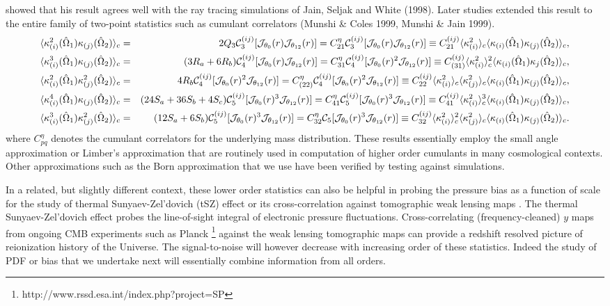 \documentclass[usenatbib]{mn2e}
\def\la{\langle}
\def\ra{\rangle}
\def\oh{\hat\Omega}
\def\oh{{\hat\Omega}}
\def\ikap0{{\cal J}_{\theta_0}(r)}
\def\ikapp{{\cal J}_{\theta_{12}}(r)}
\begin{document}
showed that his result agrees well with the ray tracing
simulations of Jain, Seljak and White (1998). Later studies 
extended this result to the entire family of two-point statistics such as cumulant correlators 
(Munshi \& Coles 1999, Munshi \& Jain 1999). 
\begin{eqnarray}
\langle \kappa_{(i)}^2(\oh_1) \kappa_{(j)}(\oh_2) \rangle_c & = &
2Q_3 {\cal C}_3^{(ij)} [\ikap0 \ikapp] =
C_{21}^{\eta}{\cal C}_3^{(ij)} [\ikap0 \ikapp] \equiv C_{21}^{(ij)} \langle
\kappa_{(i)}^2 \rangle_c \langle \kappa_{(i)}(\oh_1) \kappa_{(j)}(\oh_2) \rangle_c, \\
\langle \kappa_{(i)}^3(\oh_1) \kappa_{(j)}( \oh_2) \rangle_c & = &
(3R_a + 6 R_b){\cal C}_4^{(ij)} [\ikap0 \ikapp] =
 C_{31}^{\eta}{\cal C}_4^{(ij)} [\ikap0^2 \ikapp]
 \equiv  C_{(31)}^{(ij)} \langle
\kappa_{(i)}^2 \rangle_c^2 \langle \kappa_{(i)}(\oh_1) \kappa_{j}(\oh_2) \rangle_c
,\\  
\langle \kappa_{(i)}^2(\oh_1) \kappa_{(j)}^2(\oh_2) \rangle_c & =
& 4 R_b{\cal C}_4^{(ij)} [\ikap0^2 \ikapp] 
= C_{(22)}^{\eta}{\cal C}_4^{(ij)} [\ikap0^2 \ikapp] 
\equiv  C_{22}^{(ij)} \langle
\kappa_{(i)}^2 \rangle_c \la \kappa_{(j)}^2 \ra_c\langle \kappa_{(i)}(\oh_1) \kappa_{(j)}(\oh_2) \rangle_c ,\\
\langle \kappa_{(i)}^4(\oh_1) \kappa_{(j)}(\oh_2)\rangle_c & = &
(24S_a + 36S_b + 4 S_c){\cal C}_5^{(ij)} [\ikap0^3
\ikapp] = 
C_{41}^{\eta} {\cal C}_5^{(ij)} [\ikap0^3 \ikapp] 
\equiv  C_{41}^{(ij)} \langle
\kappa_{(i)}^2 \rangle_c^3 \langle \kappa_{(i)}(\oh_1) \kappa_{(j)}(\oh_2)
\rangle_c
,\\ \langle \kappa_{(i)}^3(\oh_1) \kappa_{(j)}^2(\oh_2) \rangle_c & = &
 (12S_a + 6 S_b){\cal C}_5^{(ij)}[\ikap0^3 \ikapp] =
C_{32}^{\eta}{\cal C}_5[\ikap0^3 \ikapp]
\equiv  C_{32}^{(ij)} \langle
\kappa_{(i)}^2 \rangle_c^2 \langle
\kappa_{(j)}^2 \rangle_c \langle \kappa_{(i)}(\oh_1) \kappa_{(j)}(\oh_2)
\rangle_c.      
\end{eqnarray}
where $C_{pq}^{\eta}$ denotes the cumulant correlators for the
underlying mass distribution. These results essentially employ the small angle approximation or Limber's approximation \citep{Limb54}
that are routinely used in computation of higher order cumulants in many cosmological contexts.
Other approximations such as the Born approximation that we use have been verified by testing
against simulations.

In a related, but slightly different context, these lower order statistics can also be helpful in probing the pressure bias
as a function of scale for the study of thermal Sunyaev-Zel'dovich (tSZ) effect or its 
cross-correlation
against tomographic weak lensing maps \citep{Mu11b}. The thermal Sunyaev-Zel'dovich effect probes the line-of-sight
integral of electronic pressure fluctuations. Cross-correlating (frequency-cleaned) $y$ maps 
from ongoing CMB experiments such as Planck \footnote{http://www.rssd.esa.int/index.php?project=SP}\citep{PC06} against
the weak lensing tomographic maps can provide a redshift resolved picture of reionization
history of the Universe. The signal-to-noise will however decrease with increasing order
of these statistics. Indeed the study of PDF or bias that we undertake next will essentially
combine information from all orders. 
\end{document}
